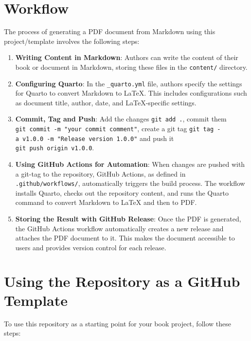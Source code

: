 \documentclass[
  letterpaper,
  paper=6in:9in,
  pagesize=pdftex,
  headinclude=on,
  footinclude=on,
  12pt]{scrbook}
\begin{document}

\chapter{Workflow}\label{workflow}

The process of generating a PDF document from Markdown using this
project/template involves the following steps:

\begin{enumerate}
\def\labelenumi{\arabic{enumi}.}
\item
  \textbf{Writing Content in Markdown}: Authors can write the content of
  their book or document in Markdown, storing these files in the
  \texttt{content/} directory.
\item
  \textbf{Configuring Quarto}: In the \texttt{\_quarto.yml} file,
  authors specify the settings for Quarto to convert Markdown to LaTeX.
  This includes configurations such as document title, author, date, and
  LaTeX-specific settings.
\item
  \textbf{Commit, Tag and Push}: Add the changes \texttt{git\ add\ .},
  commit them \texttt{git\ commit\ -m\ "your\ commit\ comment"}, create
  a git tag \texttt{git\ tag\ -a\ v1.0.0\ -m\ "Release\ version\ 1.0.0"}
  and push it \texttt{git\ push\ origin\ v1.0.0}.
\item
  \textbf{Using GitHub Actions for Automation}: When changes are pushed
  with a git-tag to the repository, GitHub Actions, as defined in
  \texttt{.github/workflows/}, automatically triggers the build process.
  The workflow installs Quarto, checks out the repository content, and
  runs the Quarto command to convert Markdown to LaTeX and then to PDF.
\item
  \textbf{Storing the Result with GitHub Release}: Once the PDF is
  generated, the GitHub Actions workflow automatically creates a new
  release and attaches the PDF document to it. This makes the document
  accessible to users and provides version control for each release.
\end{enumerate}


\chapter{Using the Repository as a GitHub
Template}\label{using-the-repository-as-a-github-template}

To use this repository as a starting point for your book project, follow
these steps:
\end{document}

